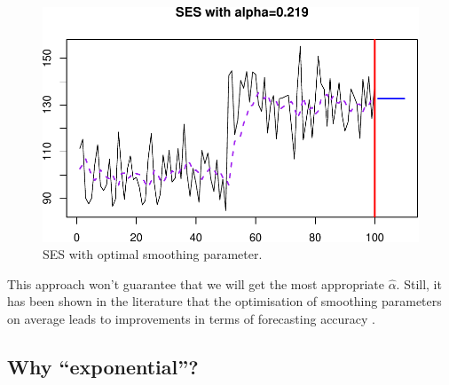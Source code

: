 \documentclass[
]{book}
\newenvironment{Shaded}{\begin{snugshade}}{\end{snugshade}}
\newcommand{\AttributeTok}[1]{\textcolor[rgb]{0.77,0.63,0.00}{#1}}
\newcommand{\DecValTok}[1]{\textcolor[rgb]{0.00,0.00,0.81}{#1}}
\newcommand{\FunctionTok}[1]{\textcolor[rgb]{0.00,0.00,0.00}{#1}}
\newcommand{\NormalTok}[1]{#1}
\newcommand{\OtherTok}[1]{\textcolor[rgb]{0.56,0.35,0.01}{#1}}
\newcommand{\SpecialCharTok}[1]{\textcolor[rgb]{0.00,0.00,0.00}{#1}}
\newcommand{\StringTok}[1]{\textcolor[rgb]{0.31,0.60,0.02}{#1}}
\theoremstyle{definition}
\theoremstyle{definition}
\theoremstyle{definition}
\theoremstyle{definition}
\theoremstyle{remark}
\begin{document}
\begin{Shaded}
\end{Shaded}

\begin{figure}
\centering
\includegraphics{Svetunkov--2022----ADAM_files/figure-latex/SESExample3-1.pdf}
\caption{\label{fig:SESExample3}SES with optimal smoothing parameter.}
\end{figure}

This approach won't guarantee that we will get the most appropriate \(\hat{\alpha}\). Still, it has been shown in the literature that the optimisation of smoothing parameters on average leads to improvements in terms of forecasting accuracy \citep[see, for example,][]{Gardner1985}.

\hypertarget{whyExponential}{%
\subsection{Why ``exponential''?}\label{whyExponential}}
\end{document}
